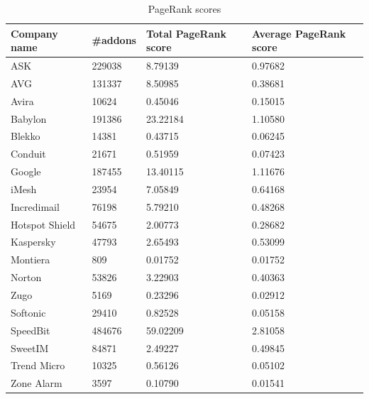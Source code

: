 \documentclass[11pt,oneside]{book}
\begin{document}
\begin{table}[h]
\centering
\caption{PageRank scores}
\label{table:pagerank_scores}
\begin{tabular}{@{}llll@{}}
\toprule
Company name   & \#addons & Total PageRank score & Average PageRank score \\ \midrule
ASK            & 229038   & 8.79139              & 0.97682                \\
AVG            & 131337   & 8.50985              & 0.38681                \\
Avira          & 10624    & 0.45046              & 0.15015                \\
Babylon        & 191386   & 23.22184             & 1.10580                \\
Blekko         & 14381    & 0.43715              & 0.06245                \\
Conduit        & 21671    & 0.51959              & 0.07423                \\
Google         & 187455   & 13.40115             & 1.11676                \\
iMesh          & 23954    & 7.05849              & 0.64168                \\
Incredimail    & 76198    & 5.79210              & 0.48268                \\
Hotspot Shield & 54675    & 2.00773              & 0.28682                \\
Kaspersky      & 47793    & 2.65493              & 0.53099                \\
Montiera       & 809      & 0.01752              & 0.01752                \\
Norton         & 53826    & 3.22903              & 0.40363                \\
Zugo           & 5169     & 0.23296              & 0.02912                \\
Softonic       & 29410    & 0.82528              & 0.05158                \\
SpeedBit       & 484676   & 59.02209             & 2.81058                \\
SweetIM        & 84871    & 2.49227              & 0.49845                \\
Trend Micro    & 10325    & 0.56126              & 0.05102                \\
Zone Alarm     & 3597     & 0.10790              & 0.01541                \\ \bottomrule
\end{tabular}
\end{table}  
\end{document}
